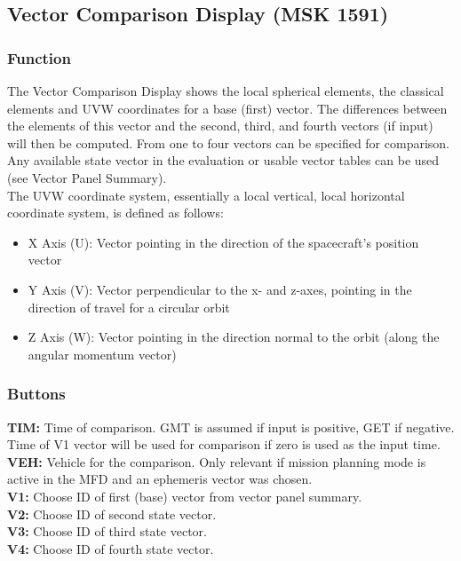 \documentclass[11pt]{article} %
\begin{document}
\subsection{Vector Comparison Display (MSK 1591)}

\subsubsection{Function}

The Vector Comparison Display shows the local spherical elements, the classical elements and UVW coordinates for a base (first) vector. The differences between the elements of this vector and the second, third, and fourth vectors (if input) will then be computed. From one to four vectors can be specified for comparison. Any available state vector in the evaluation or usable vector tables can be used (see Vector Panel Summary).\\

The UVW coordinate system, essentially a local vertical, local horizontal coordinate system, is defined as follows:

\begin{itemize}
	\item X Axis (U): Vector pointing in the direction of the spacecraft's position vector\\
	\item Y Axis (V): Vector perpendicular to the x- and z-axes, pointing in the direction of travel for a circular orbit\\
	\item Z Axis (W): Vector pointing in the direction normal to the orbit (along the angular momentum vector)\\
\end{itemize}

\subsubsection{Buttons}

\textbf{TIM:} Time of comparison. GMT is assumed if input is positive, GET if negative. Time of V1 vector will be used for comparison if zero is used as the input time.\\
\textbf{VEH:} Vehicle for the comparison. Only relevant if mission planning mode is active in the MFD and an ephemeris vector was chosen.\\
\textbf{V1:} Choose ID of first (base) vector from vector panel summary.\\
\textbf{V2:} Choose ID of second state vector.\\
\textbf{V3:} Choose ID of third state vector.\\
\textbf{V4:} Choose ID of fourth state vector.\\
\end{document}
